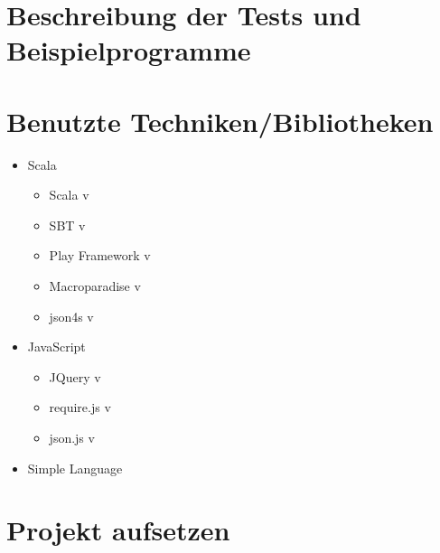 \documentclass[12pt]{scrreprt}
\begin{document}
\begin{acronym}[TU-Berlin]
 \acro{}{}
\end{acronym}


\section{Beschreibung der Tests und Beispielprogramme}


\section{Benutzte Techniken/Bibliotheken}

\begin{itemize}
  \item{Scala}
  \begin{itemize}
    \item{Scala v}
    \item{SBT v}
    \item{Play Framework v}
    \item{Macroparadise v}
    \item{json4s v}
  \end{itemize}
  \item{JavaScript}
  \begin{itemize}
    \item{JQuery v}
    \item{require.js v}
    \item{json.js v}
  \end{itemize}
  \item{Simple Language}
\end{itemize}



\section{Projekt aufsetzen}
\end{document}
